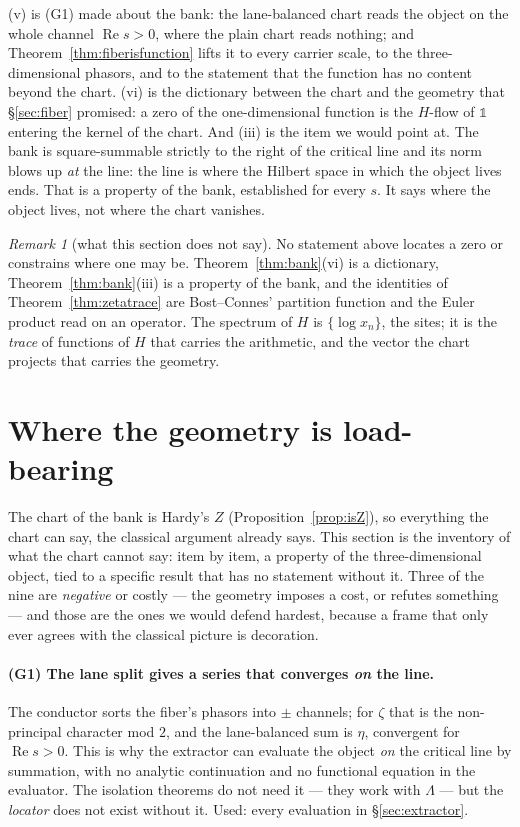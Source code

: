 \documentclass[11pt]{article}
\theoremstyle{plain}
\theoremstyle{definition}
\theoremstyle{remark}
\newtheorem{remark}[theorem]{Remark}
\begin{document}
(v) is (G1) made about the bank: the lane-balanced chart reads the object on the whole
channel $\operatorname{Re}s>0$, where the plain chart reads nothing; and
Theorem~\ref{thm:fiberisfunction} lifts it to every carrier scale, to the three-dimensional
phasors, and to the statement that the function has no content beyond the chart. (vi) is the dictionary
between the chart and the geometry that \S\ref{sec:fiber} promised: a zero of the
one-dimensional function is the $H$-flow of $\mathbb 1$ entering the kernel of the chart.
And (iii) is the item we would point at. The bank is square-summable strictly to the right
of the critical line and its norm blows up \emph{at} the line: the line is where the
Hilbert space in which the object lives ends. That is a property of the bank, established
for every $s$. It says where the object lives, not where the chart vanishes.

\begin{remark}[what this section does not say]\label{rem:hamiltonian}
No statement above locates a zero or constrains where one may be.
Theorem~\ref{thm:bank}(vi) is a dictionary, Theorem~\ref{thm:bank}(iii) is a property of
the bank, and the identities of Theorem~\ref{thm:zetatrace} are Bost--Connes' partition
function and the Euler product read on an operator. The spectrum of $H$ is
$\{\log x_n\}$, the sites; it is the \emph{trace} of functions of $H$ that carries the
arithmetic, and the vector the chart projects that carries the geometry.
\end{remark}

\section{Where the geometry is load-bearing}\label{sec:loadbearing}

The chart of the bank is Hardy's $Z$ (Proposition~\ref{prop:isZ}), so everything the
chart can say, the classical argument already says. This section is the inventory of
what the chart cannot say: item by item, a property of the three-dimensional object, tied
to a specific result that has no statement without it. Three of the nine are
\emph{negative} or costly --- the geometry imposes a cost, or refutes something --- and those are
the ones we would defend hardest, because a frame that only ever agrees with the
classical picture is decoration.

\paragraph{(G1) The lane split gives a series that converges \emph{on} the line.}
The conductor sorts the fiber's phasors into $\pm$ channels; for $\zeta$ that is the
non-principal character mod $2$, and the lane-balanced sum is $\eta$, convergent for
$\operatorname{Re}s>0$. This is why the extractor can evaluate the object \emph{on} the
critical line by summation, with no analytic continuation and no functional equation in
the evaluator. The isolation theorems do not need it --- they work with $\Lambda$ --- but
the \emph{locator} does not exist without it. Used: every evaluation in
\S\ref{sec:extractor}.
\end{document}
